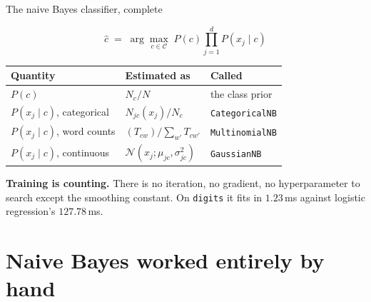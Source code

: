 \documentclass[aspectratio=169]{beamer}
\begin{document}
\begin{frame}[shrink=5]{The naive Bayes classifier, complete}
  \begin{exampleblock}{}
    \centering
    \[
      \hat{c} \;=\; \arg\max_{c \in \mathcal{C}} \;
        P(c) \prod_{j=1}^{d} P(x_j \mid c)
    \]
  \end{exampleblock}
  \begin{center}\small
  \begin{tabular}{@{}lll@{}}
    \toprule
    \textbf{Quantity} & \textbf{Estimated as} & \textbf{Called}\\
    \midrule
    $P(c)$ & $N_c / N$ & the class prior\\
    $P(x_j \mid c)$, categorical & $N_{jc}(x_j) / N_c$ &
      \texttt{CategoricalNB}\\
    $P(x_j \mid c)$, word counts & $(T_{cw}) / \sum_{w'} T_{cw'}$ &
      \texttt{MultinomialNB}\\
    $P(x_j \mid c)$, continuous & $\mathcal{N}(x_j; \mu_{jc},
      \sigma^2_{jc})$ & \texttt{GaussianNB}\\
    \bottomrule
  \end{tabular}
  \end{center}
  \begin{center}\small
    \textbf{Training is counting.} There is no iteration, no gradient, no
    hyperparameter to search except the smoothing constant. On
    \texttt{digits} it fits in $1.23$\,ms against logistic regression's
    $127.78$\,ms.
  \end{center}
\end{frame}

\section[By hand]{Naive Bayes worked entirely by hand}
\label{sec:hand}
\end{document}
